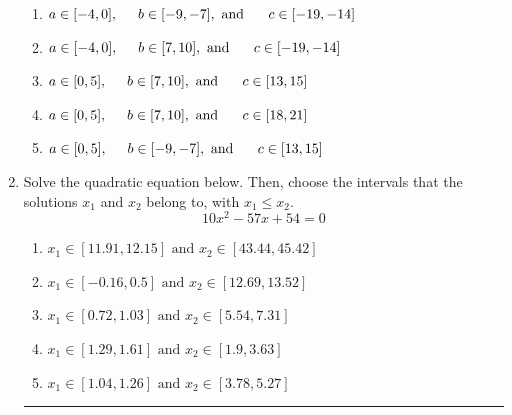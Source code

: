 \documentclass[14pt]{extbook}
\newcommand{\litem}[1]{\item#1\hspace*{-1cm}\rule{\textwidth}{0.4pt}}
\begin{document}
\begin{enumerate}
{\begin{center}
\end{center}
\begin{enumerate}[label=\Alph*.]
\item \( a \in [-4, 0], \hspace*{5mm} b \in [-9, -7], \text{ and } \hspace*{5mm} c \in [-19, -14] \)
\item \( a \in [-4, 0], \hspace*{5mm} b \in [7, 10], \text{ and } \hspace*{5mm} c \in [-19, -14] \)
\item \( a \in [0, 5], \hspace*{5mm} b \in [7, 10], \text{ and } \hspace*{5mm} c \in [13, 15] \)
\item \( a \in [0, 5], \hspace*{5mm} b \in [7, 10], \text{ and } \hspace*{5mm} c \in [18, 21] \)
\item \( a \in [0, 5], \hspace*{5mm} b \in [-9, -7], \text{ and } \hspace*{5mm} c \in [13, 15] \)

\end{enumerate} }
\litem{
Solve the quadratic equation below. Then, choose the intervals that the solutions $x_1$ and $x_2$ belong to, with $x_1 \leq x_2$.\[ 10x^{2} -57 x + 54 = 0 \]\begin{enumerate}[label=\Alph*.]
\item \( x_1 \in [11.91, 12.15] \text{ and } x_2 \in [43.44, 45.42] \)
\item \( x_1 \in [-0.16, 0.5] \text{ and } x_2 \in [12.69, 13.52] \)
\item \( x_1 \in [0.72, 1.03] \text{ and } x_2 \in [5.54, 7.31] \)
\item \( x_1 \in [1.29, 1.61] \text{ and } x_2 \in [1.9, 3.63] \)
\item \( x_1 \in [1.04, 1.26] \text{ and } x_2 \in [3.78, 5.27] \)

\end{enumerate} }
\end{enumerate}
\end{document}
